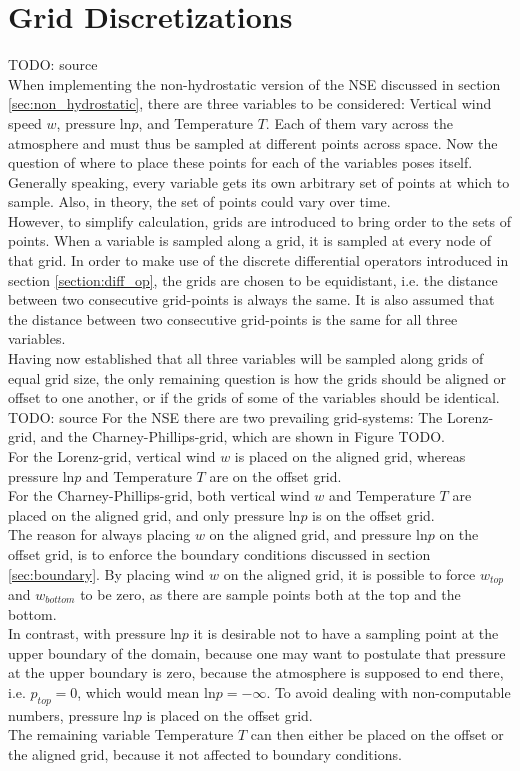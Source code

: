 \section{Grid Discretizations}
TODO: source\\
When implementing the non-hydrostatic version of the NSE discussed in section \ref{sec:non_hydrostatic}, there are three variables to be considered: Vertical wind speed $w$, pressure $\text{ln}p$, and Temperature $T$.
Each of them vary across the atmosphere and must thus be sampled at different points across space.
Now the question of where to place these points for each of the variables poses itself.\\
Generally speaking, every variable gets its own arbitrary set of points at which to sample.
Also, in theory, the set of points could vary over time.\\
However, to simplify calculation, grids are introduced to bring order to the sets of points.
When a variable is sampled along a grid, it is sampled at every node of that grid.
In order to make use of the discrete differential operators introduced in section \ref{section:diff_op}, the grids are chosen to be equidistant, i.e. the distance between two consecutive grid-points is always the same.
It is also assumed that the distance between two consecutive grid-points is the same for all three variables.\\
Having now established that all three variables will be sampled along grids of equal grid size, the only remaining question is how the grids should be aligned or offset to one another, or if the grids of some of the variables should be identical.\\
TODO: source
For the NSE there are two prevailing grid-systems: The Lorenz-grid, and the Charney-Phillips-grid, which are shown in Figure TODO.\\
For the Lorenz-grid, vertical wind $w$ is placed on the aligned grid, whereas pressure $\text{ln}p$ and Temperature $T$ are on the offset grid.\\
For the Charney-Phillips-grid, both vertical wind $w$ and Temperature $T$ are placed on the aligned grid, and only pressure $\text{ln}p$ is on the offset grid.\\
The reason for always placing $w$ on the aligned grid, and pressure $\text{ln}p$ on the offset grid, is to enforce the boundary conditions discussed in section \ref{sec:boundary}.
By placing wind $w$ on the aligned grid, it is possible to force $w_{top}$ and $w_{bottom}$ to be zero, as there are sample points both at the top and the bottom.\\
In contrast, with pressure $\text{ln}p$ it is desirable not to have a sampling point at the upper boundary of the domain, because one may want to postulate that pressure at the upper boundary is zero, because the atmosphere is supposed to end there, i.e. $p_{top}=0$, which would mean $\text{ln}p = -\infty$.
To avoid dealing with non-computable numbers, pressure $\text{ln}p$ is placed on the offset grid.\\
The remaining variable Temperature $T$ can then either be placed on the offset or the aligned grid, because it not affected to boundary conditions.


